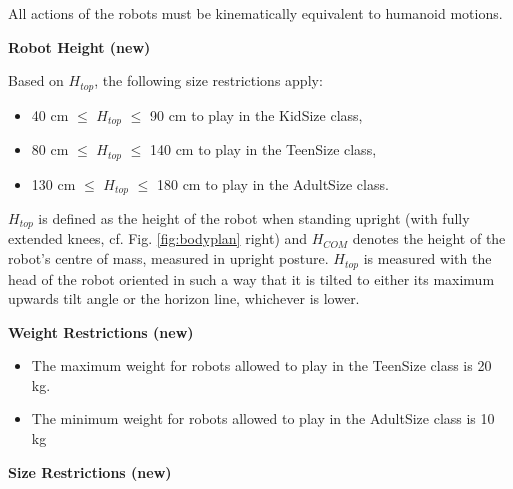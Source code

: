 All actions of the robots must be kinematically equivalent to humanoid motions.

\bigskip


\bigskip

{\bfseries Robot Height (new)}

\headlinebox

Based on $H_{top}$, the following size restrictions apply:

\begin{itemize}
\item 40 cm ${\leq}$ $H_{top}$ ${\leq}$ 90 cm to play in the KidSize class, 
\item 80 cm ${\leq}$ $H_{top}$ ${\leq}$ 140 cm to play in the TeenSize class,
\item 130 cm ${\leq}$ $H_{top}$ ${\leq}$ 180 cm to play in the AdultSize class.
\end{itemize}

$H_{top}$ is defined as the height of the robot when standing upright (with fully extended knees, cf. Fig. \ref{fig:bodyplan} right) and $H_{COM}$ denotes the height of the robot's centre of mass, measured in upright posture. $H_{top}$ is measured with the head of the robot oriented in such a way that it is tilted to either its maximum upwards tilt angle or the horizon line, whichever is lower.

\bigskip

{\bfseries Weight Restrictions (new)}

\headlinebox
\begin{itemize}
\item The maximum weight for robots allowed to play in the TeenSize class is 20 kg.
\item The minimum weight for robots allowed to play in the AdultSize class is 10 kg
\end{itemize}

\bigskip

{\bfseries Size Restrictions (new)}

\headlinebox

